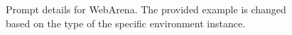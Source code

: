 \begin{tcolorbox}[breakable,title=Prompt Details for WebArena ]


\end{tcolorbox}
\begin{figure}[!h]
    \vspace{0.01cm}
    \caption{Prompt details for WebArena. The provided example is changed based on the type of the specific environment instance.}
    \label{fig:webarena_prompt}
\end{figure}
